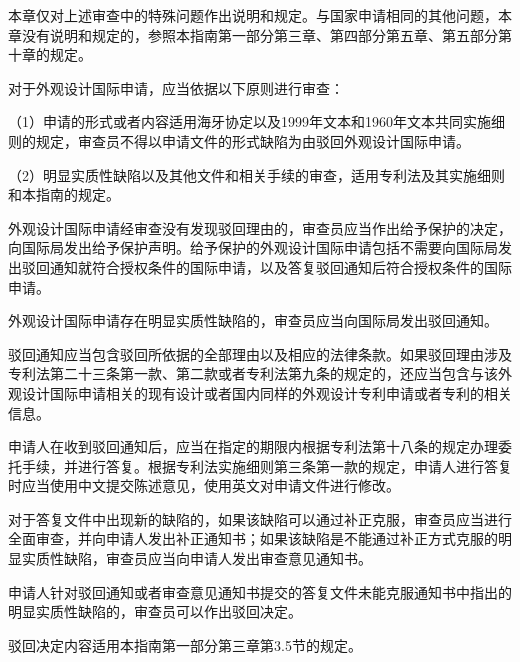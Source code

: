 本章仅对上述审查中的特殊问题作出说明和规定。与国家申请相同的其他问题，本章没有说明和规定的，参照本指南第一部分第三章、第四部分第五章、第五部分第十章的规定。

对于外观设计国际申请，应当依据以下原则进行审查：

{\setlength{\parindent}{17.1bp}（1）申请的形式或者内容适用海牙协定以及1999年文本和1960年文本共同实施细则的规定，审查员不得以申请文件的形式缺陷为由驳回外观设计国际申请。\par}

{\setlength{\parindent}{17.1bp}（2）明显实质性缺陷以及其他文件和相关手续的审查，适用专利法及其实施细则和本指南的规定。\par}

外观设计国际申请经审查没有发现驳回理由的，审查员应当作出给予保护的决定，向国际局发出给予保护声明。给予保护的外观设计国际申请包括不需要向国际局发出驳回通知就符合授权条件的国际申请，以及答复驳回通知后符合授权条件的国际申请。

外观设计国际申请存在明显实质性缺陷的，审查员应当向国际局发出驳回通知。

驳回通知应当包含驳回所依据的全部理由以及相应的法律条款。如果驳回理由涉及专利法第二十三条第一款、第二款或者专利法第九条的规定的，还应当包含与该外观设计国际申请相关的现有设计或者国内同样的外观设计专利申请或者专利的相关信息。

申请人在收到驳回通知后，应当在指定的期限内根据专利法第十八条的规定办理委托手续，并进行答复。根据专利法实施细则第三条第一款的规定，申请人进行答复时应当使用中文提交陈述意见，使用英文对申请文件进行修改。

对于答复文件中出现新的缺陷的，如果该缺陷可以通过补正克服，审查员应当进行全面审查，并向申请人发出补正通知书；如果该缺陷是不能通过补正方式克服的明显实质性缺陷，审查员应当向申请人发出审查意见通知书。

申请人针对驳回通知或者审查意见通知书提交的答复文件未能克服通知书中指出的明显实质性缺陷的，审查员可以作出驳回决定。

{\setlength{\parindent}{22.2bp}驳回决定内容适用本指南第一部分第三章第3.5节的规定。\par}

